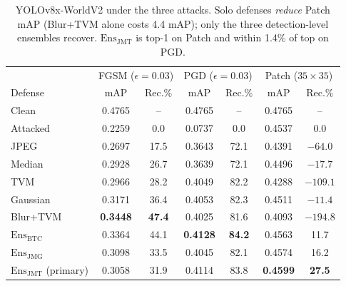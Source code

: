 \documentclass[10pt,twocolumn,letterpaper]{article}
\newcommand{\best}[1]{\textbf{#1}}
\begin{document}
\begin{table}[t]
\centering
\small
\setlength{\tabcolsep}{4.5pt}
\begin{tabular}{l|cc|cc|cc}
\toprule
 & \multicolumn{2}{c|}{FGSM ($\epsilon{=}0.03$)} & \multicolumn{2}{c|}{PGD ($\epsilon{=}0.03$)} & \multicolumn{2}{c}{Patch ($35{\times}35$)} \\
Defense & mAP & Rec.\% & mAP & Rec.\% & mAP & Rec.\% \\
\midrule
Clean     & 0.4765 &  --    & 0.4765 &  --    & 0.4765 &  --    \\
Attacked  & 0.2259 &   0.0  & 0.0737 &   0.0  & 0.4537 &   0.0  \\
\midrule
JPEG                      & 0.2697 & 17.5 & 0.3643 & 72.1 & 0.4391 & $-64.0$ \\
Median                    & 0.2928 & 26.7 & 0.3639 & 72.1 & 0.4496 & $-17.7$ \\
TVM                       & 0.2966 & 28.2 & 0.4049 & 82.2 & 0.4288 & $-109.1$ \\
Gaussian                  & 0.3171 & 36.4 & 0.4053 & 82.3 & 0.4511 & $-11.4$ \\
Blur+TVM                  & \best{0.3448} & \best{47.4} & 0.4025 & 81.6 & 0.4093 & $-194.8$ \\
\midrule
$\mathrm{Ens}_{\text{BTC}}$            & 0.3364 & 44.1 & \best{0.4128} & \best{84.2} & 0.4563 & 11.7 \\
$\mathrm{Ens}_{\text{JMG}}$            & 0.3098 & 33.5 & 0.4045 & 82.1 & 0.4574 & 16.2 \\
$\mathrm{Ens}_{\text{JMT}}$ (primary)  & 0.3058 & 31.9 & 0.4114 & 83.8 & \best{0.4599} & \best{27.5} \\
\bottomrule
\end{tabular}
\caption{YOLOv8x-WorldV2 under the three attacks. Solo defenses \emph{reduce} Patch mAP (Blur+TVM alone costs 4.4 mAP); only the three detection-level ensembles recover. $\mathrm{Ens}_{\text{JMT}}$ is top-1 on Patch and within 1.4\% of top on PGD.}
\label{tab:yolo_results}
\end{table}
\end{document}
